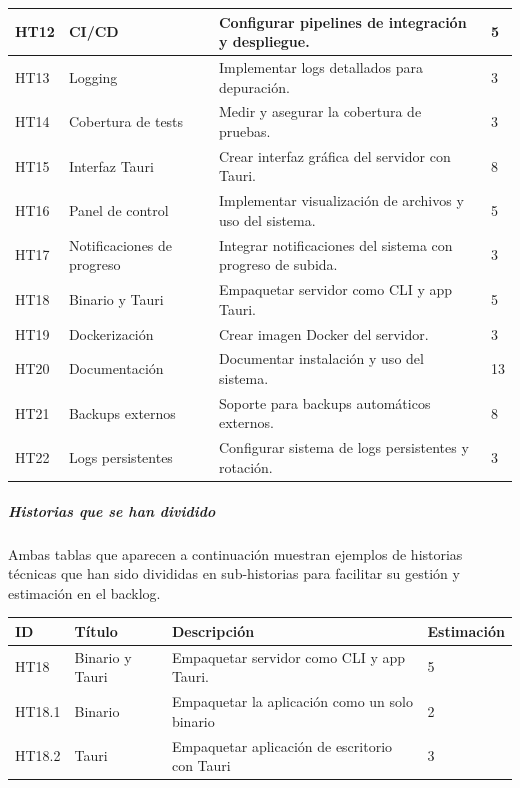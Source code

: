 \begin{tabularx}{\textwidth}{|l|l|>{\raggedright\arraybackslash}X|l|}
    \hline
    HT12 & CI/CD & Configurar pipelines de integración y despliegue. & 5 \\
    \hline
    HT13 & Logging & Implementar logs detallados para depuración. & 3 \\
    \hline
    HT14 & Cobertura de tests & Medir y asegurar la cobertura de pruebas. & 3 \\
    \hline
    HT15 & Interfaz Tauri & Crear interfaz gráfica del servidor con Tauri. & 8 \\
    \hline
    HT16 & Panel de control & Implementar visualización de archivos y uso del sistema. & 5 \\
    \hline
    HT17 & Notificaciones de progreso & Integrar notificaciones del sistema con progreso de subida. & 3 \\
    \hline
    HT18 & Binario y Tauri & Empaquetar servidor como CLI y app Tauri. & 5 \\
    \hline
    HT19 & Dockerización & Crear imagen Docker del servidor. & 3 \\
    \hline
    HT20 & Documentación & Documentar instalación y uso del sistema. & 13 \\
    \hline
    HT21 & Backups externos & Soporte para backups automáticos externos. & 8 \\
    \hline
    HT22 & Logs persistentes & Configurar sistema de logs persistentes y rotación. & 3 \\
    \hline
\end{tabularx}

\subparagraph{Historias que se han dividido}

Ambas tablas que aparecen a continuación muestran ejemplos de historias técnicas que han sido divididas en sub-historias para facilitar su gestión y estimación en el backlog.

\begin{table}[h!]
    \begin{center}
        \begin{tabularx}{\textwidth}{|l|l|>{\raggedright}X|l|}
            \hline
            ID & Título & Descripción & Estimación \\
            \hline
            HT18 & Binario y Tauri & Empaquetar servidor como CLI y app Tauri. & 5 \\
            \hline
            HT18.1 & Binario & Empaquetar la aplicación como un solo binario & 2 \\
            \hline
            HT18.2 & Tauri & Empaquetar aplicación de escritorio con Tauri & 3 \\
            \hline
        \end{tabularx}
    \end{center}
\end{table}

